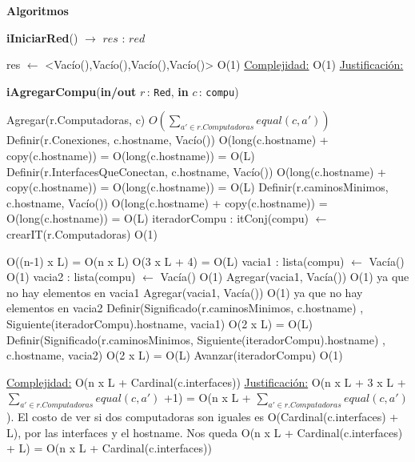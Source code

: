 \documentclass[a4paper,10pt]{article}
\let\TipoVariable=\texttt
\let\ModificadorArgumento=\textbf
\newcommand{\In}[2]{\ModificadorArgumento{in} \ensuremath{#1}\,: \TipoVariable{#2}\xspace}
\newcommand{\Inout}[2]{\ModificadorArgumento{in/out} \ensuremath{#1}\,: \TipoVariable{#2}\xspace}
\newenvironment{Algoritmos}{%
  \vspace*{2ex}%
  \noindent\textbf{\Large Algoritmos}%
  \vspace*{2ex}%
}{}
\begin{document}
\begin{Algoritmos}

\begin{algorithm}[H]{\textbf{iIniciarRed}() $\to$ $res$ : $red$} 
	\begin{algorithmic}
	
			\State res $\gets$ <Vac\'io(),Vac\'io(),Vac\'io(),Vac\'io()>  \Comment O(1) 
			\medskip
			\Statex \underline{Complejidad:} O(1)
			\Statex \underline{Justificación:} 
    	\end{algorithmic}
\end{algorithm}

\begin{algorithm}[H]{\textbf{iAgregarCompu}(\Inout {r}{Red}, \In {c}{compu})} 
	\begin{algorithmic}
			\State Agregar(r.Computadoras, c) 		   \Comment $O(\sum_{a' \in r.Computadoras} equal(c,a'))$%
			\State Definir(r.Conexiones, c.hostname, Vac\'io())	\Comment O(long(c.hostname) + copy(c.hostname))	= O(long(c.hostname)) = O(L)
			\State Definir(r.InterfacesQueConectan, c.hostname, Vac\'io())       \Comment O(long(c.hostname) + copy(c.hostname))	= O(long(c.hostname)) = O(L)
			\State Definir(r.caminosMinimos, c.hostname, Vac\'io())       \Comment O(long(c.hostname) + copy(c.hostname))	= O(long(c.hostname)) = O(L)
			\State iteradorCompu : itConj(compu) $\gets$ crearIT(r.Computadoras) 		\Comment O(1)
			
			 				\Comment O((n-1) x L) = O(n x L)
			   		\Comment O(3 x L + 4) = O(L)
			    \State vacia1 : lista(compu) $\gets$ Vac\'ia()   			\Comment O(1)
			    \State vacia2 : lista(compu) $\gets$ Vac\'ia()   			\Comment O(1)
			    \State Agregar(vacia1, Vac\'ia()) 		\Comment O(1) ya que no hay elementos en vacia1
			    \State Agregar(vacia1, Vac\'ia()) 		\Comment O(1) ya que no hay elementos en vacia2
			    \State Definir(Significado(r.caminosMinimos, c.hostname) , Siguiente(iteradorCompu).hostname, vacia1) 		\Comment O(2 x L) = O(L)
			    \State Definir(Significado(r.caminosMinimos, Siguiente(iteradorCompu).hostname) , c.hostname, vacia2) 		\Comment O(2 x L) = O(L)
			  \EndIf
			  \State Avanzar(iteradorCompu)   \Comment O(1)
			\EndWhile
			
			
			\medskip
			\Statex \underline{Complejidad:} O(n x L + Cardinal(c.interfaces))
			\Statex \underline{Justificación:} O(n x L + 3 x L + $\sum_{a' \in r.Computadoras} equal(c,a')$ +1) = O(n x L + $\sum_{a' \in r.Computadoras} equal(c,a')$). El costo de ver si dos computadoras son iguales es O(Cardinal(c.interfaces) + L), por las interfaces y el hostname. Nos queda O(n x L + Cardinal(c.interfaces) + L) = O(n x L + Cardinal(c.interfaces))  
    	\end{algorithmic}
\end{algorithm}


\end{Algoritmos}
\end{document}
